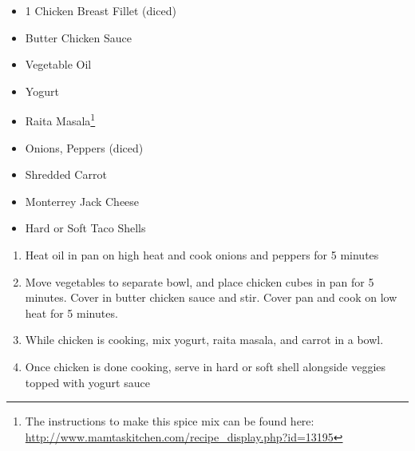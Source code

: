 \documentclass[oneside]{recipe}
\newcommand{\recipecolumn}[2]{
	\begin{multicols}{2}
	\raggedcolumns
	#1
	\columnbreak
	#2
	\end{multicols}
}
\begin{document}
\recipecolumn{
	\begin{itemize}
		\item 1 Chicken Breast Fillet (diced)
		\item Butter Chicken Sauce
		\item Vegetable Oil
		\item Yogurt
		\item Raita Masala\footnote{The instructions to make this spice mix can be found here: \url{http://www.mamtaskitchen.com/recipe_display.php?id=13195}}
		\item Onions, Peppers (diced)
		\item Shredded Carrot
		\item Monterrey Jack Cheese
		\item Hard or Soft Taco Shells
	\end{itemize}
}{
	\begin{enumerate}
		\item Heat oil in pan on high heat and cook onions and peppers for 5 minutes
		\item Move vegetables to separate bowl, and place chicken cubes in pan for 5 minutes. Cover in butter chicken sauce and stir. Cover pan and cook on low heat for 5 minutes. 
		\item While chicken is cooking, mix yogurt, raita masala, and carrot in a bowl. 
		\item Once chicken is done cooking, serve in hard or soft shell alongside veggies topped with yogurt sauce
	\end{enumerate}
}
\end{document}
